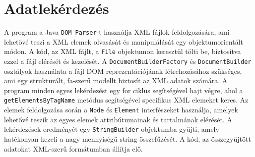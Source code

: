 \documentclass[12pt]{report}
\begin{document}
\section{Adatlekérdezés}
\indent\indent A program a Java \texttt{DOM Parser}-t használja XML fájlok feldolgozására, ami lehetővé teszi a XML elemek olvasását és manipulálását egy objektumorientált módon. A kód, az XML fájlt, a \texttt{File} objektumon keresztül tölti be, biztosítva ezzel a fájl elérését és kezelését. A \texttt{DocumentBuilderFactory} és \texttt{DocumentBuilder} osztályok használata a fájl DOM reprezentációjának létrehozásához szükséges, ami egy strukturált, fa-szerű modellt biztosít az XML adatok számára. A program minden egyes lekérdezést egy for ciklus segítségével hajt végre, ahol a \texttt{getElementsByTagName} metódus segítségével specifikus XML elemeket keres. Az elemek feldolgozása során a \texttt{Node} és \texttt{Element} interfészeket használja, amelyek lehetővé teszik az egyes elemek attribútumainak és tartalmának elérését. A lekérdezések eredményét egy \texttt{StringBuilder} objektumba gyűjti, amely hatékonyan kezeli a nagy mennyiségű string összefűzését. A kód, az összegyűjtött adatokat XML-szerű formátumban állítja elő.\\
\end{document}
